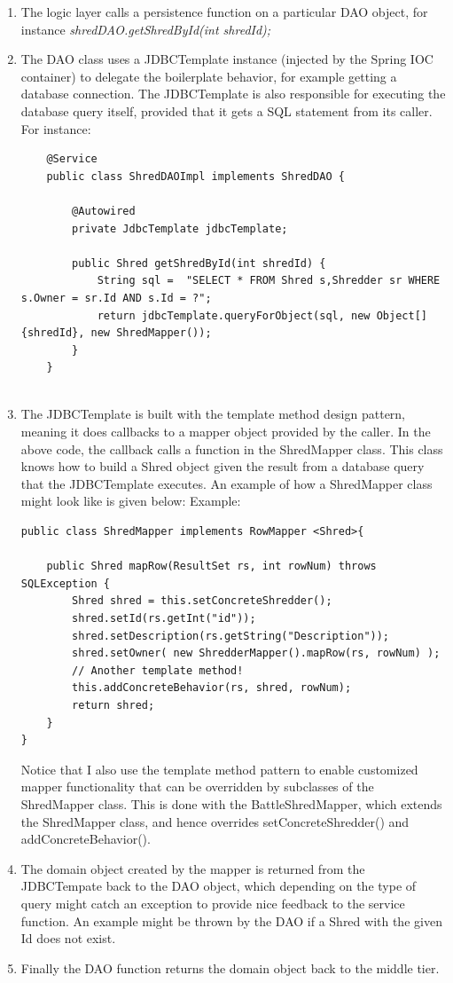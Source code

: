 \begin{enumerate}
\item{} The logic layer calls a persistence function on a particular DAO object, for instance \textit{shredDAO.getShredById(int shredId); }
\item{} The DAO class uses a JDBCTemplate instance (injected by the Spring IOC container) to delegate the boilerplate behavior, for example getting a database connection. The JDBCTemplate is also responsible for executing the database query itself, provided that it gets a SQL statement from its caller. For instance: 
	\begin{lstlisting}
	@Service
	public class ShredDAOImpl implements ShredDAO {
	
		@Autowired
		private JdbcTemplate jdbcTemplate;
		
		public Shred getShredById(int shredId) {
			String sql =  "SELECT * FROM Shred s,Shredder sr WHERE s.Owner = sr.Id AND s.Id = ?";
			return jdbcTemplate.queryForObject(sql, new Object[]{shredId}, new ShredMapper());
		}
	}
	
	\end{lstlisting}
\item{} The JDBCTemplate is built with the template method design pattern, meaning it does callbacks to a mapper object provided by the caller. In the above code, the callback calls a function in the ShredMapper class. This class knows how to build a Shred object given the result from a database query that the JDBCTemplate executes. An example of how a ShredMapper class might look like is given below:
Example:
\begin{lstlisting}
public class ShredMapper implements RowMapper <Shred>{
	
	public Shred mapRow(ResultSet rs, int rowNum) throws SQLException {
		Shred shred = this.setConcreteShredder();
		shred.setId(rs.getInt("id"));
		shred.setDescription(rs.getString("Description"));
		shred.setOwner( new ShredderMapper().mapRow(rs, rowNum) );
		// Another template method!
		this.addConcreteBehavior(rs, shred, rowNum);
		return shred;
	}
}

\end{lstlisting}
Notice that I also use the template method pattern to enable customized mapper functionality that can be overridden by subclasses of the ShredMapper class. This is done with the BattleShredMapper, which extends the ShredMapper class, and hence overrides setConcreteShredder() and addConcreteBehavior(). 
	
\item{} The domain object created by the mapper is returned from the JDBCTempate back to the DAO object, which depending on the type of query might catch an exception to provide nice feedback to the service function. An example might be thrown by the DAO if a Shred with the given Id does not exist.
\item{} Finally the DAO function returns the domain object back to the middle tier. 
\end{enumerate}	
	
